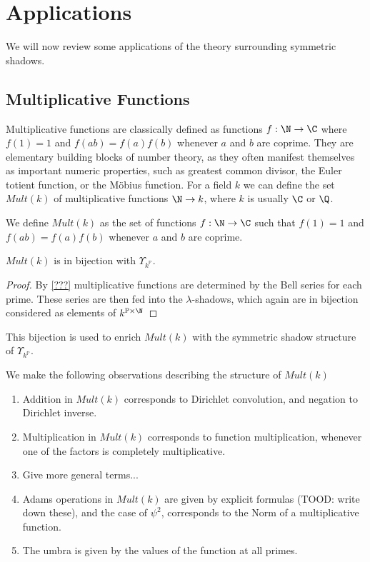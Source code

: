 \section{Applications}

We will now review some applications of the theory surrounding symmetric shadows.

\subsection{Multiplicative Functions}
Multiplicative functions are classically defined as functions $f : \N \to \C$ where $f(1) = 1$ and $f(ab) = f(a)f(b)$ whenever $a$ and $b$ are coprime. They are elementary building blocks of number theory, as they often manifest themselves as important numeric properties, such as greatest common divisor, the Euler totient function, or the M\"obius function. For a field $k$ we can define the set $Mult(k)$ of multiplicative functions $\N \to k$, where $k$ is usually $\C$ or $\Q$. 

\begin{definition}
  We define $Mult(k)$ as the set of functions $f : \N \to \C$ such that $f(1) = 1$ and $f(ab) = f(a)f(b)$ whenever $a$ and $b$ are coprime.
\end{definition}

\begin{propdef}
  $Mult(k)$ is in bijection with $\Upsilon_{k^\mathbb{P}}$.
\end{propdef}

\begin{proof}
  By \ref{???} multiplicative functions are determined by the Bell series for each prime. These series are then fed into the $\lambda$-shadows, which again are in bijection considered as elements of $k^{\mathbb{P} \times \N}$
\end{proof}

\begin{definition}
  This bijection is used to enrich $Mult(k)$ with the symmetric shadow structure of $\Upsilon_{k^\mathbb{P}}$.
\end{definition}

\begin{theorem} We make the following observations describing the structure of $Mult(k)$
  \begin{enumerate}
    \item Addition in $Mult(k)$ corresponds to Dirichlet convolution, and negation to Dirichlet inverse.
    \item Multiplication in $Mult(k)$ corresponds to function multiplication, whenever one of the factors is completely multiplicative. 
    \item Give more general terms...
    \item Adams operations in $Mult(k)$ are given by explicit formulas (TOOD: write down these), and the case of $\psi^2$, corresponds to the Norm of a multiplicative function.
    \item The umbra is given by the values of the function at all primes.
  \end{enumerate}
\end{theorem}

